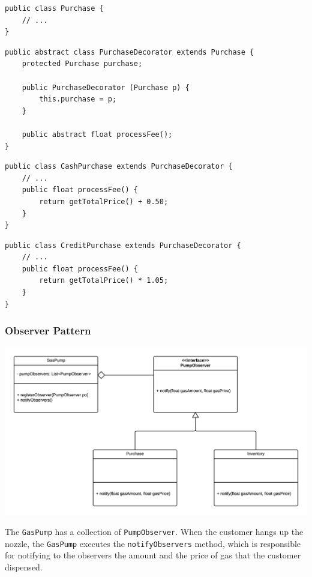 \documentclass[11pt, a4paper]{article}
\newcommand{\settextlisting}{\lstset{ basicstyle=\small\ttfamily }}
\newcommand{\setcodelisting}{\lstset{ basicstyle=\footnotesize\ttfamily }}
\begin{document}
\bigskip
\setcodelisting
\begin{lstlisting}
public class Purchase {
	// ...
}
\end{lstlisting}


\begin{lstlisting}
public abstract class PurchaseDecorator extends Purchase {
	protected Purchase purchase;
	
	public PurchaseDecorator (Purchase p) {
		this.purchase = p;
	}
	
	public abstract float processFee();
}
\end{lstlisting}


\begin{lstlisting}
public class CashPurchase extends PurchaseDecorator {
	// ...
	public float processFee() {
		return getTotalPrice() + 0.50;
	}
}
\end{lstlisting}


\begin{lstlisting}
public class CreditPurchase extends PurchaseDecorator {
	// ...
	public float processFee() {
		return getTotalPrice() * 1.05;
	}
}
\end{lstlisting}




\subsubsection{Observer Pattern}

\includegraphics[width=\textwidth]{ObserverPattern.png}

\settextlisting
The \lstinline|GasPump| has a collection of \lstinline|PumpObserver|.
When the customer hangs up the nozzle, the \lstinline|GasPump| executes the \lstinline|notifyObservers| method, which is responsible for notifying to the observers the amount and the price of gas that the customer dispensed.
\end{document}
